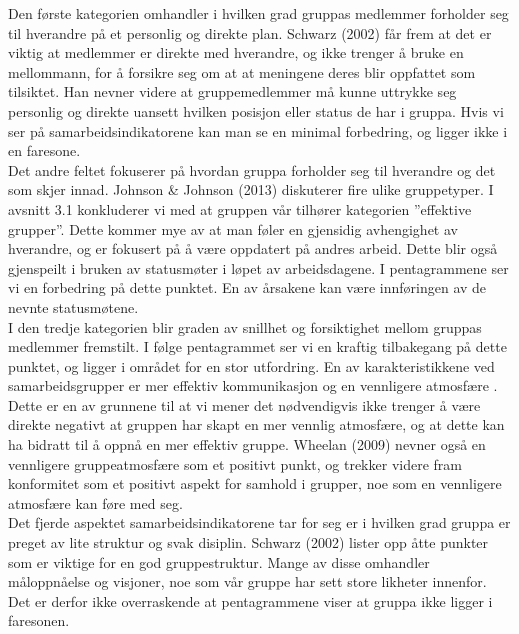 Den første kategorien omhandler i hvilken grad gruppas medlemmer forholder seg til hverandre på et personlig og direkte plan. Schwarz (2002)\cite{fasilitator} får frem at det er viktig at medlemmer er direkte med hverandre, og ikke trenger å bruke en mellommann, for å forsikre seg om at at meningene deres blir oppfattet som tilsiktet. Han nevner videre at gruppemedlemmer må kunne uttrykke seg personlig og direkte uansett hvilken posisjon eller status de har i gruppa. Hvis vi ser på samarbeidsindikatorene kan man se en minimal forbedring, og ligger ikke i en faresone.\\

Det andre feltet fokuserer på hvordan gruppa forholder seg til hverandre og det som skjer innad. Johnson & Johnson (2013)\cite{gruppeteori} diskuterer fire ulike gruppetyper. I avsnitt 3.1 konkluderer vi med at gruppen vår tilhører kategorien ''effektive grupper''. Dette kommer mye av at man føler en gjensidig avhengighet av hverandre, og er fokusert på å være oppdatert på andres arbeid. Dette blir også gjenspeilt i bruken av statusmøter i løpet av arbeidsdagene. I pentagrammene ser vi en forbedring på dette punktet. En av årsakene kan være innføringen av de nevnte statusmøtene.\\

I den tredje kategorien blir graden av snillhet og forsiktighet mellom gruppas medlemmer fremstilt. I følge pentagrammet ser vi en kraftig tilbakegang på dette punktet, og ligger i området for en stor utfordring. En av karakteristikkene ved samarbeidsgrupper er mer effektiv kommunikasjon og en vennligere atmosfære \cite{fasilitator}. Dette er en av grunnene til at vi mener det nødvendigvis ikke trenger å være direkte negativt at gruppen har skapt en mer vennlig atmosfære, og at dette kan ha bidratt til å oppnå en mer effektiv gruppe. Wheelan (2009)\cite{effectiveTeams} nevner også en vennligere gruppeatmosfære som et positivt punkt, og trekker videre fram konformitet som et positivt aspekt for samhold i grupper, noe som en vennligere atmosfære kan føre med seg.\\

Det fjerde aspektet samarbeidsindikatorene tar for seg er i hvilken grad gruppa er preget av lite struktur og svak disiplin. Schwarz (2002)\cite{fasilitator} lister opp åtte punkter som er viktige for en god gruppestruktur. Mange av disse omhandler måloppnåelse og visjoner, noe som vår gruppe har sett store likheter innenfor. Det er derfor ikke overraskende at pentagrammene viser at gruppa ikke ligger i faresonen.\\

